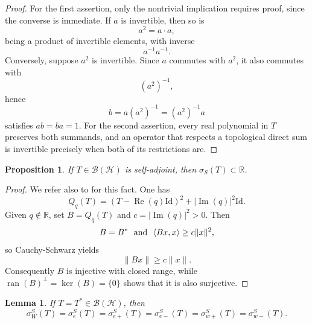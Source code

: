 \documentclass[12pt,a4paper]{article}
\theoremstyle{plain}
\newtheorem{proposition}[theorem]{Proposition}
\newtheorem{lemma}[theorem]{Lemma}
\theoremstyle{definition}
\theoremstyle{remark}
\newcommand{\RR}{\mathbb R}
\newcommand{\BB}{\mathcal B}
\newcommand{\Id}{\mathrm{Id}}
\newcommand{\HS}{\mathcal H}
\newcommand{\sigS}{\sigma_S}
\newcommand{\sigeS}{\sigma_{e}^{S}}
\newcommand{\sigwS}{\sigma_{W}^{S}}
\newcommand{\sigeuS}{\sigma_{e+}^{S}}
\newcommand{\sigedS}{\sigma_{e-}^{S}}
\newcommand{\sigwuS}{\sigma_{w+}^{S}}
\newcommand{\sigwdS}{\sigma_{w-}^{S}}
\DeclareMathOperator{\ran}{ran}
\DeclareMathOperator{\Rea}{Re}
\DeclareMathOperator{\Ima}{Im}
\begin{document}
{\begin{proof}
For the first assertion, only the nontrivial implication requires proof,
since the converse is immediate. If $a$ is invertible, then so is
$$a^2=a\cdot a,$$ being a product of invertible elements, with inverse
$$a^{-1}a^{-1}.$$ Conversely, suppose $a^2$ is invertible. Since $a$
commutes with $a^2$, it also commutes with $$(a^2)^{-1},$$ hence
$$b=a(a^2)^{-1}=(a^2)^{-1}a$$ satisfies $ab=ba=1$. For the second
assertion, every real polynomial in $T$ preserves both summands, and an
operator that respects a topological direct sum is invertible precisely
when both of its restrictions are.
\end{proof}

\begin{proposition}
\label{prop:real-spectrum}
If $T\in\BB(\HS)$ is self-adjoint, then $\sigS(T)\subset\RR$.
\end{proposition}
\begin{proof}
We refer also to \cite[Theorem 2.11(ii)]{AlpayColomboKimsey2016} for
this fact. One has
$$Q_q(T)=(T-\Rea(q)\Id)^2+|\Ima(q)|^2\Id.$$ Given $q\notin\RR$, set
$B=Q_q(T)$ and $c=|\Ima(q)|^2>0$. Then $$B=B^* ~~\hbox{and}~~
\langle Bx,x\rangle\ge c\|x\|^2,$$ so Cauchy-Schwarz yields
$$\|Bx\|\ge c\|x\|.$$ Consequently $B$ is injective with closed range,
while $\ran(B)^\perp=\ker(B)=\{0\}$ shows that it is also surjective.
\end{proof}
\begin{lemma}
\label{lem:hierarchy}
If $T=T^*\in\BB(\HS)$, then
\[
 \sigwS(T)=\sigeS(T)=\sigeuS(T)=\sigedS(T)=\sigwuS(T)=\sigwdS(T).
\]
\end{lemma}

}
\end{document}
